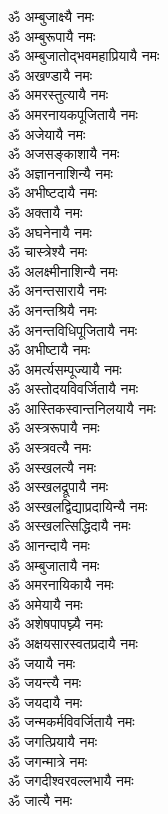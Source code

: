\begin{flushleft}
\begin{multicols}{2}
ॐ अम्बुजाक्ष्यै नमः\\
ॐ अम्बुरूपायै नमः\\
ॐ अम्बुजातोद्भवमहाप्रियायै नमः\\
ॐ अखण्डायै नमः\\
ॐ अमरस्तुत्यायै नमः\\
ॐ अमरनायकपूजितायै नमः\\
ॐ अजेयायै नमः\hfill{}\\
ॐ अजसङ्काशायै नमः\\
ॐ अज्ञाननाशिन्यै नमः\\
ॐ अभीष्टदायै नमः\\
ॐ अक्तायै नमः\\
ॐ अघनेनायै नमः\\
ॐ चास्त्रेश्यै नमः\\
ॐ अलक्ष्मीनाशिन्यै नमः\\
ॐ अनन्तसारायै नमः\\
ॐ अनन्तश्रियै नमः\\
ॐ अनन्तविधिपूजितायै नमः\hfill{}\\
ॐ अभीष्टायै नमः\\
ॐ अमर्त्यसम्पूज्यायै नमः\\
ॐ अस्तोदयविवर्जितायै नमः\\
ॐ आस्तिकस्वान्तनिलयायै नमः\\
ॐ अस्त्ररूपायै नमः\\
ॐ अस्त्रवत्यै नमः\\
ॐ अस्खलत्यै नमः\\
ॐ अस्खलद्रूपायै नमः\\
ॐ अस्खलद्विद्याप्रदायिन्यै नमः\\
ॐ अस्खलत्सिद्धिदायै नमः\hfill{}\\
ॐ आनन्दायै नमः\\
ॐ अम्बुजातायै नमः\\
ॐ अमरनायिकायै नमः\\
ॐ अमेयायै नमः\\
ॐ अशेषपापघ्न्यै नमः\\
ॐ अक्षयसारस्वतप्रदायै नमः\\
ॐ जयायै नमः\\
ॐ जयन्त्यै नमः\\
ॐ जयदायै नमः\\
ॐ जन्मकर्मविवर्जितायै नमः\hfill{}\\
ॐ जगत्प्रियायै नमः\\
ॐ जगन्मात्रे नमः\\
ॐ जगदीश्वरवल्लभायै नमः\\
ॐ जात्यै नमः\\

\end{multicols}
\end{flushleft}
